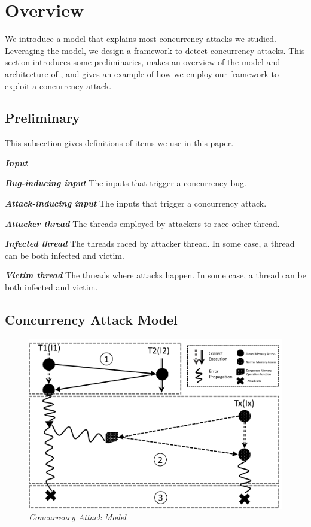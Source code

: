 
\section{Overview}\label{sec:overview}
We introduce a model that explains most concurrency attacks we studied. 
Leveraging the model, we design a framework \xxx
to detect concurrency attacks. 
This section introduces some preliminaries, 
makes an overview of the model and architecture of \xxx, 
and gives an example of how we employ our framework to exploit a concurrency attack. 

\subsection{Preliminary}\label{sec:preliminary}

This subsection gives definitions of items we use in this paper.

\emph{\textbf{Input}}

\emph{\textbf{Bug-inducing input}} The inputs that trigger a concurrency bug. 

\emph{\textbf{Attack-inducing input}} The inputs that trigger a concurrency attack.

\emph{\textbf{Attacker thread}} The threads employed by attackers to race other thread.

\emph{\textbf{Infected thread}} The threads raced by attacker thread. In some case, a thread 
can be both infected and victim.

\emph{\textbf{Victim thread}} The threads where attacks happen. In some case, a thread 
can be both infected and victim.


\subsection{Concurrency Attack Model}\label{sec:model}



\begin{figure}
	\centering
	\includegraphics[width=1\columnwidth]{figures/model}
	\vspace{-.25in}
	\caption{{\em Concurrency Attack Model}} 
	\label{fig:model}
	\vspace{-0.1in}
\end{figure}




